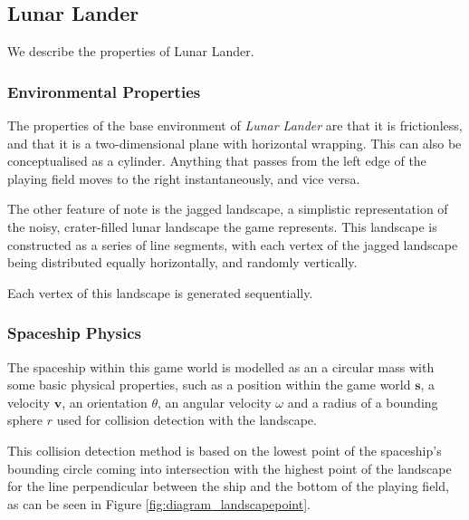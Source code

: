 \documentclass[conference]{IEEEtran}
\begin{document}
\subsection{Lunar Lander}
We describe the properties of Lunar Lander. 

\subsubsection{Environmental Properties}

The properties of the base environment of {\itshape Lunar Lander} are that it is frictionless, and that it is a two-dimensional plane with horizontal wrapping. This can also be conceptualised as a cylinder. Anything that passes from the left edge of the playing field moves to the right instantaneously, and vice versa.

The other feature of note is the jagged landscape, a simplistic representation of the noisy, crater-filled lunar landscape the game represents. This landscape is constructed as a series of line segments, with each vertex of the jagged landscape being distributed equally horizontally, and randomly vertically. %



Each vertex of this landscape is generated sequentially. %


\subsubsection{Spaceship Physics}

The spaceship within this game world is modelled as an a circular mass with some basic physical properties, such as a position within the game world $\boldsymbol {s}$, a velocity $\boldsymbol {v}$, an orientation $\theta$, an angular velocity $\omega$ and a radius of a bounding sphere $r$ used for collision detection with the landscape.

This collision detection method is based on the lowest point of the spaceship's bounding circle coming into intersection with the highest point of the landscape for the line perpendicular between the ship and the bottom of the playing field, as can be seen in Figure \ref{fig:diagram_landscapepoint}.
\end{document}

